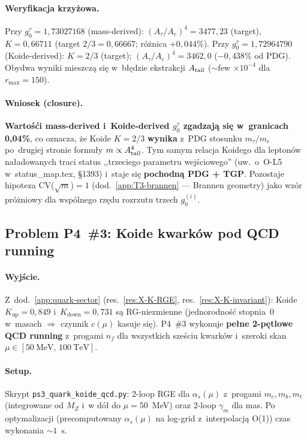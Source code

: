 \paragraph{Weryfikacja krzy\.zowa.}
Przy $g_0^\tau = 1{,}73027168$ (mass-derived):
$(A_\tau/A_e)^4 = 3477{,}23$ (target), $K=0{,}66711$
(target $2/3 = 0{,}66667$; r\'o\.znica $+0{,}044\%$).
Przy $g_0^\tau = 1{,}72964790$ (Koide-derived):
$K=2/3$ (target); $(A_\tau/A_e)^4 = 3462{,}0$ ($-0{,}438\%$ od PDG).
Obydwa wyniki mieszcz\k{a} si\k{e} w~b\l{}\k{e}dzie ekstrakcji $A_{\rm tail}$
($\sim$few $\times 10^{-4}$ dla $r_{\max}=150$).

\paragraph{Wniosek (closure).}
\textbf{Warto\'s\'ci mass-derived i~Koide-derived $g_0^\tau$ zgadzaj\k{a} si\k{e}
w~granicach 0{,}04\%}, co oznacza, \.ze Koide $K=2/3$ \textbf{wynika}
z~PDG stosunku $m_\tau/m_e$ po~drugiej stronie formu\l{}y $m \propto A_{\rm tail}^4$.
Tym samym relacja Koidego dla lepton\'ow na\l{}adowanych traci
status ,,trzeciego parametru wej\'sciowego'' (uw.\ o~O-L5
w~status\_map.tex, \S1393) i~staje si\k{e} \textbf{pochodn\k{a} PDG + TGP}.
Pozostaje hipoteza CV($\sqrt m$)$=1$
(dod.~\ref{app:T3-brannen} --- Brannen geometry) jako wz\'or pr\'o\.zniowy
dla wsp\'olnego rz\k{e}du rozrzutu trzech $g_0^{(i)}$.

\subsection{Problem P4~\#3: Koide kwark\'ow pod QCD running}%
\label{app:P4-quarks}

\paragraph{Wyj\'scie.}
Z~dod.~\ref{app:quark-sector} (res.~\ref{res:X-K-RGE}, res.~\ref{res:X-K-invariant}):
Koide $K_\text{up}=0{,}849$ i~$K_\text{down}=0{,}731$ s\k{a} RG-niezmienne
(jednorodno\'s\'c stopnia~$0$ w~masach $\Rightarrow$ czynnik $c(\mu)$
kasuje si\k{e}). P4~\#3 wykonuje \textbf{pe\l{}ne 2-p\k{e}tlowe QCD running}
z~progami $n_f$ dla wszystkich sze\'sciu kwark\'ow i~szeroki skan
$\mu \in [50~\mathrm{MeV},\,100~\mathrm{TeV}]$.

\paragraph{Setup.}
Skrypt \texttt{ps3\_quark\_koide\_qcd.py}: 2-loop RGE dla $\alpha_s(\mu)$
z~progami $m_c, m_b, m_t$ (integrowane od $M_Z$ i~w d\'o\l{} do $\mu=50$~MeV)
oraz 2-loop $\gamma_m$ dla mas. Po optymalizacji
(precomputowany $\alpha_s(\mu)$ na log-grid z~interpolacj\k{a} O(1))
czas wykonania $\sim 1$~s.

